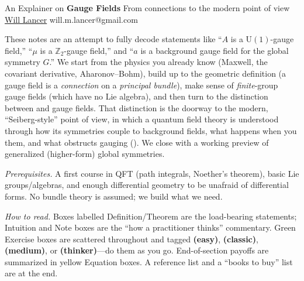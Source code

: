 \documentclass[11pt]{article}
\newcommand{\Uone}{\mathrm{U}(1)}
\newcommand{\Ztwo}{\mathbb{Z}_2}
\begin{document}
\thispagestyle{empty}
\bigskip
\vspace{0.1cm}
\begin{center}
{\fontsize{20}{20} \selectfont An Explainer on}
\vskip 14pt
{\fontsize{34}{34} \selectfont \bf \sffamily Gauge Fields}
\vskip 10pt
{\fontsize{16}{16}\selectfont \sffamily From connections to the modern point of view}
\vskip 22pt
{\fontsize{16}{16} \selectfont \rmfamily \href{https://will-lancer.github.io}{Will Lancer}}
\vskip 6pt
{\fontsize{12}{12} \selectfont \ttfamily will.m.lancer@gmail.com}
\vskip 18pt
\end{center}

{\parindent0pt \baselineskip=15.5pt}
\noin
These notes are an attempt to fully decode statements like ``$A$ is a $\Uone$-gauge
field,'' ``$\mu$ is a $\Ztwo$-gauge field,'' and ``$a$ is a background gauge field for
the global symmetry $G$.'' We start from the physics you already know (Maxwell, the
covariant derivative, Aharonov--Bohm), build up to the geometric definition
(a gauge field is a \emph{connection} on a \emph{principal bundle}), make sense of
\emph{finite}-group gauge fields (which have no Lie algebra), and then turn to the
distinction between  and  gauge fields. That
distinction is the doorway to the modern, ``Seiberg-style'' point of view, in which a
quantum field theory is understood through how its symmetries couple to background
fields, what happens when you  them, and what obstructs gauging
(). We close with a working preview of generalized
(higher-form) global symmetries.

\medskip
\noin
\emph{Prerequisites.} A first course in QFT (path integrals, Noether's theorem), basic
Lie groups/algebras, and enough differential geometry to be unafraid of differential
forms. No bundle theory is assumed; we build what we need.

\medskip
\noin
\emph{How to read.} Boxes labelled \textsf{Definition}/\textsf{Theorem} are the
load-bearing statements; \textsf{Intuition} and \textsf{Note} boxes are the
``how a practitioner thinks'' commentary. Green \textsf{Exercise} boxes are scattered
throughout and tagged \textbf{(easy)}, \textbf{(classic)}, \textbf{(medium)}, or
\textbf{(thinker)}---do them as you go. End-of-section payoffs are summarized in
yellow \textsf{Equation} boxes. A reference list and a ``books to buy'' list are at the
end.

\newpage
\microtoc
\newpage

\end{document}
